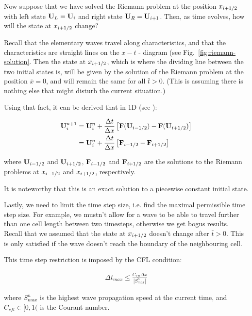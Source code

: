 Now suppose that we have solved the Riemann problem at the position
$x_{i+1/2}$ with left state $\mathbf{U}_L = \mathbf{U}_i$ and right state $\mathbf{U}_R = \mathbf{U}_{i+1}$.
Then, as time evolves, how will the state at $x_{i+1/2}$ change?

Recall that the elementary waves travel along characteristics, and that the
characteristics are straight lines on the $x-t$ - diagram (see
Fig.~\ref{fig:riemann-solution}. Then the state at $x_{i+1/2}$, which is
where the dividing line between the two initial states is, will be given by the
solution of the Riemann problem at the position $\bar{x} = 0$, and will remain
the same for all $\bar{t} > 0$. (This is assuming there is nothing else that
might disturb the current situation.)


Using that fact, it can be derived that in 1D (see \cite{toro}):

\begin{align}
\mathbf{U}^{n+1}_i &=
	\mathbf{U}^n_i + \frac{\Delta t}{\Delta x}
	\left[
		\mathbf{F}(\mathbf{U}_{i-1/2}) - \mathbf{F}(\mathbf{U}_{i+1/2})
	\right]
\label{eq:godunov-discretized}
\\
&=
	\mathbf{U}^n_i + \frac{\Delta t}{\Delta x}
	\left[
		\mathbf{F}_{i-1/2} - \mathbf{F}_{i+1/2}
	\right]
\nonumber
\end{align}

where $\mathbf{U}_{i-1/2}$ and $\mathbf{U}_{i+1/2}$, $\mathbf{F}_{i-1/2}$ and $\mathbf{F}_{i+1/2}$ are
the solutions to the Riemann problems at $x_{i-1/2}$ and $x_{i+1/2}$,
respectively.


It is noteworthy that this is an exact solution to a piecewise constant initial
state.




Lastly, we need to limit the time step size, i.e. find the maximal permissible
time step size. For example, we mustn't allow for a wave to be able to travel
further than one cell length between two timesteps, otherwise we get bogus
results. Recall that we assumed that the state at $x_{i+1/2}$ doesn't
change after $\bar{t} > 0$.
This is only satisfied if the wave doesn't reach the boundary of the
neighbouring cell.

This time step restriction is imposed by the CFL condition:

\begin{align}
\Delta t_{max} \leq \frac{C_{cfl} \Delta x}{|S_{max}^n|}
\label{eq:godunov-cfl}
\end{align}


where $S_{max}^n$ is the highest wave propagation speed at the current time,
and $C_{cfl} \in [0, 1($ is the Courant number.


